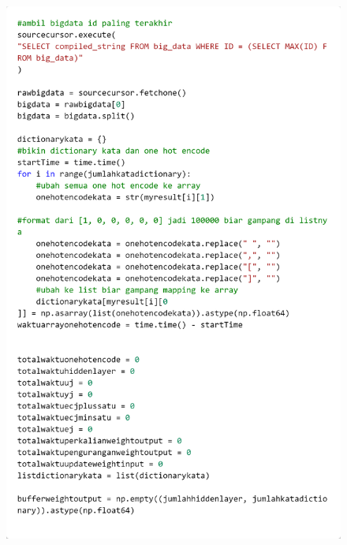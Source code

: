 \documentclass[12pt]{report}
\begin{document}
\begin{figure}[H]
\centering
\includegraphics[scale=0.3]{training2}
\end{figure}
\end{document}
